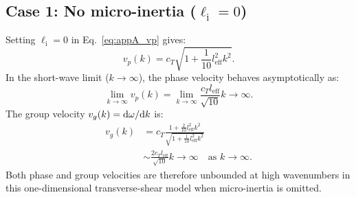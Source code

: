 \subsection{Case 1: No micro-inertia ($\ell_{\mathrm{i}} = 0$)}
Setting $\ell_{\mathrm{i}} = 0$ in Eq.~\eqref{eq:appA_vp} gives:
\begin{equation}
v_p(k) = c_T \sqrt{1 + \frac{1}{10} l_{\mathrm{eff}}^2 k^2}.
\label{eq:appA_vp_zero}
\end{equation}
In the short-wave limit ($k \to \infty$), the phase velocity behaves asymptotically as:
\begin{equation}
\lim_{k \to \infty} v_p(k) = \lim_{k \to \infty} \frac{c_T l_{\mathrm{eff}}}{\sqrt{10}} k \to \infty.
\label{eq:appA_unbounded}
\end{equation}
The group velocity $v_g(k) = \mathrm{d}\omega/\mathrm{d} k$ is:
\begin{equation}
\begin{split}
v_g(k) &= c_T \frac{1 + \frac{2}{10} l_{\mathrm{eff}}^2 k^2}{\sqrt{1 + \frac{1}{10} l_{\mathrm{eff}}^2 k^2}} \\
&\sim \frac{2 c_T l_{\mathrm{eff}}}{\sqrt{10}} k \to \infty \quad \text{as } k \to \infty.
\end{split}
\label{eq:appA_vg_unbounded}
\end{equation}
Both phase and group velocities are therefore unbounded at high wavenumbers in this one-dimensional transverse-shear model when micro-inertia is omitted.


